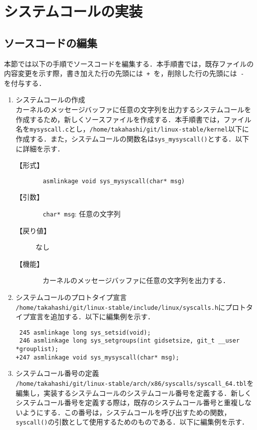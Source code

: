 \documentclass[12pt]{jsarticle}
\begin{document}
\newpage
\section{システムコールの実装}
\label{sec:overview}
\subsection{ソースコードの編集}
本節では以下の手順でソースコードを編集する．本手順書では，既存ファイルの内容変更を示す際，書き加えた行の先頭には\verb| + |を，削除した行の先頭には\verb| - |を付与する．
\begin{enumerate}
\item システムコールの作成\\
  カーネルのメッセージバッファに任意の文字列を出力するシステムコールを作成するため，新しくソースファイルを作成する．本手順書では，ファイル名を\verb|mysyscall.c|とし，\verb|/home/takahashi/git/linux-stable/kernel|以下に作成する．また，システムコールの関数名は\verb|sys_mysyscall()|とする．以下に詳細を示す．
  \begin{description}
  \item[【形式】] \verb|  asmlinkage void sys_mysyscall(char* msg)|
  \item[【引数】] \verb|  char* msg|: 任意の文字列
  \item[【戻り値】] なし
  \item[【機能】] 　カーネルのメッセージバッファに任意の文字列を出力する．
  \end{description}

\item システムコールのプロトタイプ宣言\\
  \verb|/home/takahashi/git/linux-stable/include/linux/syscalls.h|にプロトタイプ宣言を追加する．以下に編集例を示す．

\begin{verbatim}
 245 asmlinkage long sys_setsid(void);
 246 asmlinkage long sys_setgroups(int gidsetsize, git_t __user *grouplist);
+247 asmlinkage void sys_mysyscall(char* msg);
\end{verbatim}

\item システムコール番号の定義\\
  \verb|/home/takahashi/git/linux-stable/arch/x86/syscalls/syscall_64.tbl|を編集し，実装するシステムコールのシステムコール番号を定義する．新しくシステムコール番号を定義する際は，既存のシステムコール番号と重複しないようにする．この番号は，システムコールを呼び出すための関数，\verb|syscall()|の引数として使用するためのものである．以下に編集例を示す．


\end{enumerate}
\end{document}
